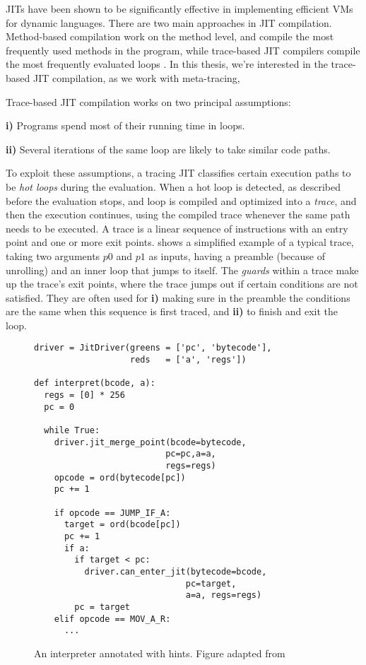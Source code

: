 JITs have been shown to be significantly effective in implementing
efficient VMs for dynamic languages. There are two main approaches in
JIT compilation. Method-based compilation work on the method level,
and compile the most frequently used methods in the program, while
trace-based JIT compilers compile the most frequently evaluated loops
\cite{survey:05,jit-history:03}. In this thesis, we're interested in
the trace-based JIT compilation, as we work with meta-tracing,

Trace-based JIT compilation works on two principal assumptions:

\textbf{i)} Programs spend most of their running time in loops.

\textbf{ii)} Several iterations of the same loop are likely to take
similar code paths.

To exploit these assumptions, a tracing JIT classifies certain
execution paths to be \emph{hot loops} during the evaluation. When a
hot loop is detected, as described before the evaluation stops, and
loop is compiled and optimized into a \emph{trace}, and then the
execution continues, using the compiled trace whenever the same path
needs to be executed. A trace is a linear sequence of instructions
with an entry point and one or more exit points. 
shows a simplified example of a typical trace, taking two arguments
$p0$ and $p1$ as inputs, having a preamble (because of unrolling) and
an inner loop that jumps to itself. The \emph{guards} within a trace
make up the trace's exit points, where the trace jumps out if certain
conditions are not satisfied. They are often used for \textbf{i)}
making sure in the preamble the conditions are the same when this
sequence is first traced, and \textbf{ii)} to finish and exit the
loop.


\begin{wrapfigure}[19]{r}{0.35\textwidth}
    \vspace{-0.5cm}
    \centering
    \begin{minipage}[t]{0.32\textwidth}
      \begin{verbatim}
driver = JitDriver(greens = ['pc', 'bytecode'],
                   reds   = ['a', 'regs'])

def interpret(bcode, a):
  regs = [0] * 256
  pc = 0

  while True:
    driver.jit_merge_point(bcode=bytecode,
                          pc=pc,a=a,
                          regs=regs)
    opcode = ord(bytecode[pc])
    pc += 1

    if opcode == JUMP_IF_A:
      target = ord(bcode[pc])
      pc += 1
      if a:
        if target < pc:
          driver.can_enter_jit(bytecode=bcode,
                              pc=target,
                              a=a, regs=regs)
        pc = target
    elif opcode == MOV_A_R:
      ...
    \end{verbatim}
    \end{minipage}
    \caption{\small An interpreter annotated with hints. Figure
      adapted from \cite{bolz09}}
    \label{fig:rpython-interp}
  \end{wrapfigure}

